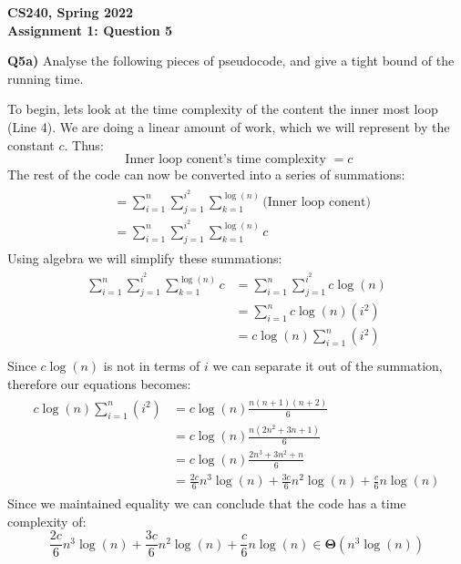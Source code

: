 \documentclass[12pt]{article}
\begin{document}
\begin{center}
{\Large\textbf{CS240, Spring 2022}}\\
\vspace{2mm}
{\Large\textbf{Assignment 1: Question 5}}\\
\vspace{3mm}
\end{center}
\[ \]
\textbf{Q5a)} Analyse the following pieces of pseudocode, and give a tight bound of the running time. \\
\begin{adjustwidth}{0em}{0pt}
To begin, lets look at the time complexity of the content the inner most loop (Line 4). We are doing a linear amount of work, which we will represent by the constant $c$. Thus:
\[ \text{ Inner loop conent's time complexity  } = c \]
The rest of the code can now be converted into a series of summations:
\begin{align*}
    \begin{aligned}
       &= \sum^{n}_{i=1}\sum^{i^2}_{j=1}\sum^{\log(n)}_{k=1} \text{(Inner loop conent)} \\
       &= \sum^{n}_{i=1}\sum^{i^2}_{j=1}\sum^{\log(n)}_{k=1}c
    \end{aligned}
\end{align*}
Using algebra we will simplify these summations:
\begin{align*}
    \begin{aligned}
        \sum^{n}_{i=1}\sum^{i^2}_{j=1}\sum^{\log(n)}_{k=1}c &= \sum^{n}_{i=1}\sum^{i^2}_{j=1}c\log(n) \\
       &= \sum^{n}_{i=1}c\log(n)(i^2) \\
       &= c\log(n) \sum^{n}_{i=1}(i^2) \\
    \end{aligned}
\end{align*}
Since $c\log(n)$ is not in terms of $i$ we can separate it out of the summation, therefore our equations becomes:
\begin{align*}
    \begin{aligned}
        c\log(n) \sum^{n}_{i=1}(i^2) &= c\log(n)\frac{n(n+1)(n+2)}{6} \\
       &= c\log(n)\frac{n(2n^2+3n+1)}{6} \\
       &= c\log(n)\frac{2n^3+3n^2+n}{6} \\
       &= \frac{2c}{6}n^3\log(n) + \frac{3c}{6}n^2\log(n) + \frac{c}{6}n\log(n)
    \end{aligned}
\end{align*}
Since we maintained equality we can conclude that the code has a time complexity of:
\[ \frac{2c}{6}n^3\log(n) + \frac{3c}{6}n^2\log(n) + \frac{c}{6}n\log(n) \in \bm{\Theta}(n^3\log(n)) \]
\end{adjustwidth}
\end{document}
